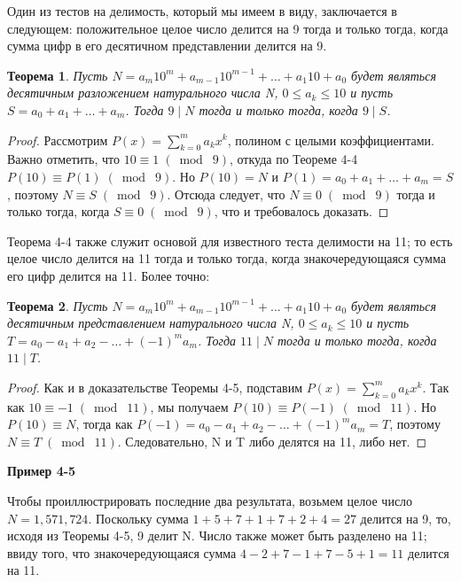 \documentclass[11pt]{article}
\newtheorem{theorem}{Теорема}
\begin{document}
Один из тестов на делимость, который мы имеем в виду, заключается в следующем: положительное целое число делится на 9 тогда и только тогда, когда сумма цифр в его десятичном представлении делится на 9.

\begin{theorem}
Пусть $ N=a_{m}10^{m}+a_{m-1}10^{m-1}+\ldots+a_{1}10+a_{0} $ будет являться десятичным разложением натурального числа N, $ 0\leq a_{k}\leq 10 $ и пусть $ S=a_{0}+a_{1}+\ldots+a_{m} $. Тогда $ 9\mid N $ тогда и только тогда, когда $ 9\mid S $.
\end{theorem}

\begin{proof}
Рассмотрим $ P(x)=\sum_{k=0}^ma_{k}x^{k} $, полином с целыми коэффициентами. Важно отметить, что $ 10\equiv1 \;(\bmod\; 9) $, откуда по Теореме 4-4 $ P(10)\equiv P(1) \;(\bmod\; 9) $. Но $ P(10)=N $ и $ P(1)=a_{0}+a_{1}+\ldots+a_{m}=S $, поэтому $ N\equiv S \;(\bmod\; 9) $. Отсюда следует, что  $ N\equiv 0 \;(\bmod\; 9) $ тогда и только тогда, когда  $ S\equiv 0 \;(\bmod\; 9) $, что и требовалось доказать.
\end{proof}

Теорема 4-4 также служит основой для известного теста делимости на 11; то есть целое число делится на 11 тогда и только тогда, когда знакочередующаяся сумма его цифр делится на 11. Более точно:

\begin{theorem}
Пусть $ N=a_{m}10^{m}+a_{m-1}10^{m-1}+\ldots+a_{1}10+a_{0} $ будет являться десятичным представлением натурального числа N, $ 0\leq a_{k}\leq 10 $ и пусть $ T=a_{0}-a_{1}+a_{2}-\ldots+(-1)^{m}a_{m} $. Тогда $ 11\mid N $ тогда и только тогда, когда $ 11\mid T $.
\end{theorem}

\begin{proof}
Как и в доказательстве Теоремы 4-5, подставим $ P(x)=\sum_{k=0}^ma_{k}x^{k} $. Так как  $ 10\equiv -1 \;(\bmod\; 11) $, мы получаем $ P(10)\equiv P(-1) \;(\bmod\; 11) $. Но  $ P(10)\equiv N $, тогда как  $ P(-1)=a_{0}-a_{1}+a_{2}-\ldots+(-1)^{m}a_{m}=T $, поэтому $ N\equiv T \;(\bmod\; 11) $. Следовательно, N и T либо делятся на 11, либо нет.
\end{proof}

 \begin{flushleft}
\bf Пример 4-5
\end{flushleft}
Чтобы проиллюстрировать последние два результата, возьмем целое число $ N=1,571,724 $. Поскольку сумма $ 1+5+7+1+7+2+4=27 $ делится на 9, то, исходя из Теоремы 4-5, 9 делит N. Число также может быть разделено на 11; ввиду того, что знакочередующаяся сумма $ 4-2+7-1+7-5+1=11 $ делится на 11.
\end{document}

